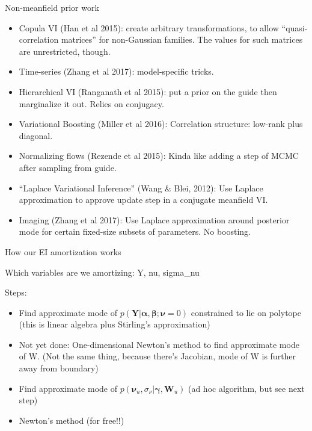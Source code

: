 \documentclass[
  ignorenonframetext,
]{beamer}
\providecommand{\tightlist}{%
  \setlength{\itemsep}{0pt}\setlength{\parskip}{0pt}}
\begin{document}
\begin{frame}{Non-meanfield prior work}
\protect\hypertarget{non-meanfield-prior-work}{}

\begin{itemize}
\tightlist
\item
  Copula VI (Han et al 2015): create arbitrary transformations, to allow
  ``quasi-correlation matrices'' for non-Gaussian families. The values
  for such matrices are unrestricted, though.
\item
  Time-series (Zhang et al 2017): model-specific tricks.
\item
  Hierarchical VI (Ranganath et al 2015): put a prior on the guide then
  marginalize it out. Relies on conjugacy.
\item
  Variational Boosting (Miller et al 2016): Correlation structure:
  low-rank plus diagonal.
\item
  Normalizing flows (Rezende et al 2015): Kinda like adding a step of
  MCMC after sampling from guide.
\item
  ``Laplace Variational Inference'' (Wang \& Blei, 2012): Use Laplace
  approximation to approve update step in a conjugate meanfield VI.
\item
  Imaging (Zhang et al 2017): Use Laplace approximation around posterior
  mode for certain fixed-size subsets of parameters. No boosting.
\end{itemize}

\end{frame}

\begin{frame}{How our EI amortization works}
\protect\hypertarget{how-our-ei-amortization-works}{}

Which variables are we amortizing: Y, nu, sigma\_nu

Steps:

\begin{itemize}
\tightlist
\item
  Find approximate mode of
  \(p(\bm{Y}|\bm{\alpha}, \bm{\beta};\bm{\nu}=0)\) constrained to lie on
  polytope (this is linear algebra plus Stirling's approximation)
\item
  Not yet done: One-dimensional Newton's method to find approximate mode
  of W. (Not the same thing, because there's Jacobian, mode of W is
  further away from boundary)
\item
  Find approximate mode of
  \(p(\bm{\nu}_u, \sigma_{\nu}| \bm{\gamma}, \bm{W}_u)\) (ad hoc
  algorithm, but see next step)
\item
  Newton's method (for free!!)
\end{itemize}

\end{frame}
\end{document}
